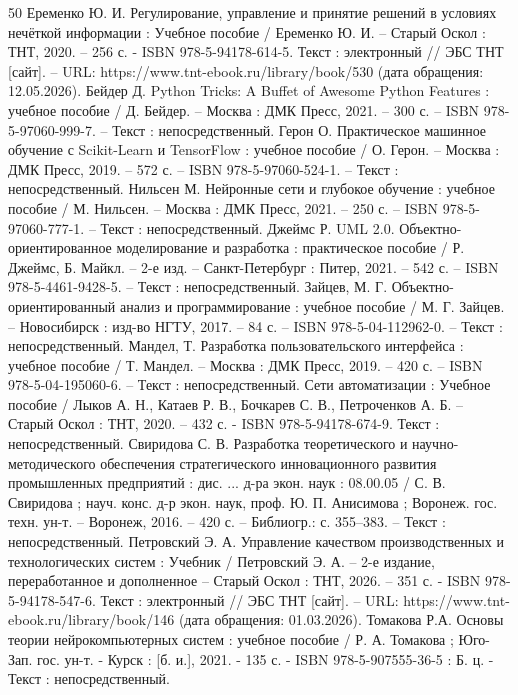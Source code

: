 \begin{thebibliography}{50}
 Еременко Ю. И. Регулирование, управление и принятие решений в условиях нечёткой информации : Учебное пособие / Еременко Ю. И. – Старый Оскол : ТНТ, 2020. – 256 с. - ISBN 978-5-94178-614-5. Текст : электронный // ЭБС ТНТ [сайт]. – URL: https://www.tnt-ebook.ru/library/book/530 (дата обращения: 12.05.2026). 
 Бейдер Д. Python Tricks: A Buffet of Awesome Python Features : учебное пособие / Д. Бейдер. – Москва : ДМК Пресс, 2021. – 300 с. – ISBN 978-5-97060-999-7. – Текст : непосредственный.
 Герон О. Практическое машинное обучение с Scikit-Learn и TensorFlow : учебное пособие / О. Герон. – Москва : ДМК Пресс, 2019. – 572 с. – ISBN 978-5-97060-524-1. – Текст : непосредственный.
 Нильсен М. Нейронные сети и глубокое обучение : учебное пособие / М. Нильсен. – Москва : ДМК Пресс, 2021. – 250 с. – ISBN 978-5-97060-777-1. – Текст : непосредственный.
 Джеймс Р. UML 2.0. Объектно-ориентированное моделирование и разработка : практическое пособие / Р. Джеймс, Б. Майкл. – 2-е изд. – Санкт-Петербург : Питер, 2021. – 542 с. – ISBN 978-5-4461-9428-5. – Текст : непосредственный.
 Зайцев, М. Г. Объектно-ориентированный анализ и программирование : учебное пособие / М. Г. Зайцев. – Новосибирск : изд-во НГТУ, 2017. – 84 с. – ISBN 978-5-04-112962-0. – Текст : непосредственный.
 Мандел, Т. Разработка пользовательского интерфейса : учебное пособие / Т. Мандел. – Москва : ДМК Пресс, 2019. – 420 с. – ISBN 978-5-04-195060-6. – Текст : непосредственный.
 Сети автоматизации : Учебное пособие / Лыков А. Н., Катаев Р. В., Бочкарев С. В., Петроченков А. Б. – Старый Оскол : ТНТ, 2020. – 432 с. - ISBN 978-5-94178-674-9. Текст : непосредственный.
 Свиридова С. В. Разработка теоретического и научно-методического обеспечения стратегического инновационного развития промышленных предприятий : дис. ... д-ра экон. наук : 08.00.05 / С. В. Свиридова ; науч. конс. д-р экон. наук, проф. Ю. П. Анисимова ; Воронеж. гос. техн. ун-т. – Воронеж, 2016. – 420 с. – Библиогр.: с. 355–383. – Текст : непосредственный.
 Петровский Э. А. Управление качеством производственных и технологических систем : Учебник / Петровский Э. А. – 2-е издание, переработанное и дополненное – Старый Оскол : ТНТ, 2026. – 351 с. - ISBN 978-5-94178-547-6. Текст : электронный // ЭБС ТНТ [сайт]. – URL: https://www.tnt-ebook.ru/library/book/146 (дата обращения: 01.03.2026).
 Томакова Р.А.  Основы теории нейрокомпьютерных систем : учебное пособие / Р. А. Томакова ; Юго-Зап. гос. ун-т. - Курск : [б. и.], 2021. - 135 с. - ISBN 978-5-907555-36-5 : Б. ц. - Текст : непосредственный.

\end{thebibliography}
